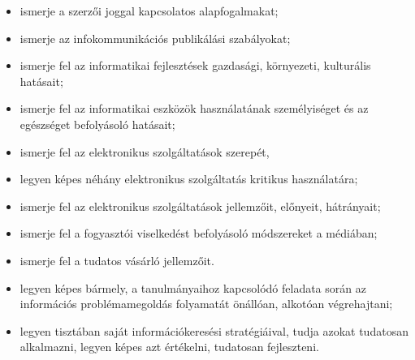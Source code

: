 \begin{itemize}
\item ismerje a szerzői joggal kapcsolatos alapfogalmakat;
\item ismerje az infokommunikációs publikálási szabályokat;
\item ismerje fel az informatikai fejlesztések gazdasági, környezeti, kulturális hatásait;
\item ismerje fel az informatikai eszközök használatának személyiséget és az egészséget befolyásoló hatásait;
\item ismerje fel az elektronikus szolgáltatások szerepét,
\item legyen képes néhány elektronikus szolgáltatás kritikus használatára;
\item ismerje fel az elektronikus szolgáltatások jellemzőit, előnyeit, hátrányait;
\item ismerje fel a fogyasztói viselkedést befolyásoló módszereket a médiában;
\item ismerje fel a tudatos vásárló jellemzőit.
\item legyen képes bármely, a tanulmányaihoz kapcsolódó feladata során az információs problémamegoldás folyamatát önállóan, alkotóan végrehajtani;
\item legyen tisztában saját információkeresési stratégiáival, tudja azokat tudatosan alkalmazni, legyen képes azt értékelni, tudatosan fejleszteni.
\end{itemize}
